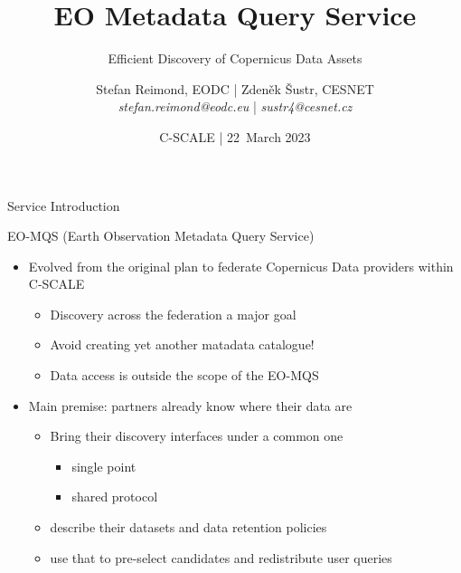 \documentclass[c,aspectratio=169,14pt]{beamer}
\begin{document}
\title{EO Metadata Query Service}
\subtitle{Efficient Discovery of Copernicus Data Assets}
\author{Stefan Reimond, EODC | Zdeněk Šustr, CESNET\\\textit{stefan.reimond@eodc.eu} | \textit{sustr4@cesnet.cz}}
\date{C-SCALE | 22~March 2023}

\begin{frame}[plain]
\vspace{8ex}
\maketitle
\end{frame}


\begin{frame}{Service Introduction}

EO-MQS (Earth Observation Metadata Query Service)
\begin{itemize}
\item Evolved from the original plan to federate Copernicus Data providers within C-SCALE
\begin{itemize}
\item \alert{Discovery} across the federation a major goal
\item \alert{Avoid} creating yet another matadata catalogue!
\item Data \alert{access} is outside the scope of the EO-MQS 
\end{itemize}
\item Main premise: partners already know where their data are
\begin{itemize}
\item Bring their discovery interfaces under a common one
\begin{itemize}
\item single point
\item shared protocol
\end{itemize}
\item describe their datasets and data retention policies
\item use that to pre-select candidates and redistribute user queries
\end{itemize}
\end{itemize}
\end{frame}
\end{document}
